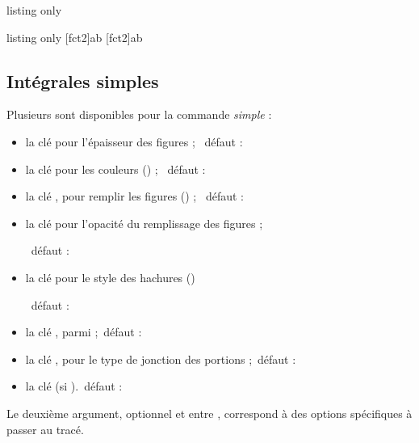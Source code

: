 \begin{PresCodeTexPL}{listing only}
\end{PresCodeTexPL}

\begin{PresCodeTexPL}{listing only}
[fct2]{a}{b}     %
[fct2]{a}{b} %
\end{PresCodeTexPL}

\subsection{Intégrales simples}

\begin{cautionblock}
Plusieurs  sont disponibles pour la commande \textit{simple} :

\begin{itemize}
	\item la clé  pour l'épaisseur des \og figures \fg{} ; \hfill~défaut : \Cle{1pt}
	\item la clé  pour les couleurs () \fg{} ; \hfill~défaut : 
	\item la clé , pour remplir les \og figures \fg{} () ; \hfill~défaut : 
	\item la clé  pour l'opacité du remplissage des \og figures \fg{} ;
	
	\hfill~défaut : 
	\item la clé  pour le style des hachures ()
	
	\hfill~défaut : 
	\item la clé , parmi  ;\hfill~défaut : 
	\item la clé , pour le type de jonction des portions ;\hfill~défaut : 
	\item la clé  (si ).\hfill~défaut : 
\end{itemize}

\smallskip

Le deuxième argument, optionnel et entre , correspond à des options spécifiques à passer au tracé.

\smallskip


\end{cautionblock}
